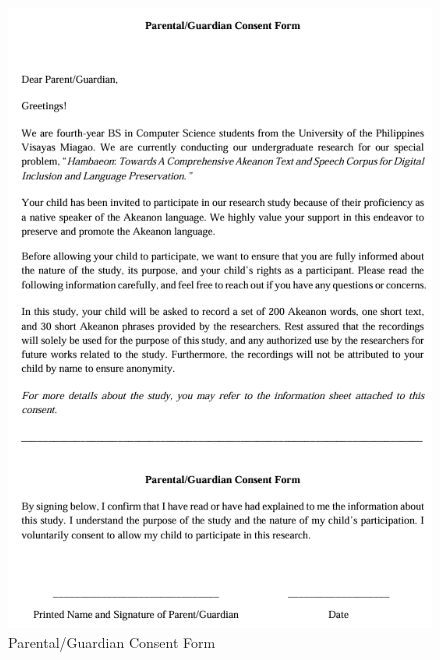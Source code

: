 \begin{figure}[h!]
	\centering
	\includegraphics[width=\textwidth]{./appendix/parental_consent_form.png}
	\caption{Parental/Guardian Consent Form}
	\label{fig:parentalConsentForm}
\end{figure}

